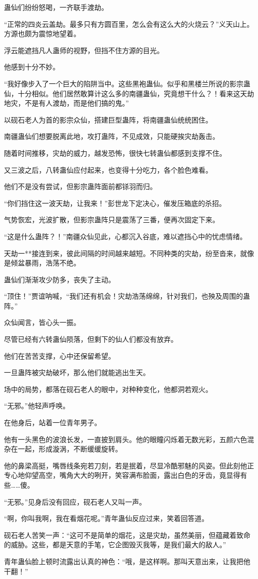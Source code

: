 \begin{this_body}
蛊仙们纷纷怒喝，一齐联手渡劫。

“正常的四炎云盖劫。最多只有方圆百里，怎么会有这么大的火烧云？”义天山上。方源也颇为震惊地望着。

浮云能遮挡凡人蛊师的视野，但挡不住方源的目光。

他感到十分不妙。

“我好像步入了一个巨大的陷阱当中。这些黑袍蛊仙。似乎和黑楼兰所说的影宗蛊仙，十分相似。他们居然敢算计这么多的南疆蛊仙，究竟想干什么？！看来这天劫地灾，不是有人渡劫，而是他们搞的鬼。”

以砚石老人为首的影宗众仙，搭建巨型蛊阵，将南疆蛊仙统统困住。

南疆蛊仙们想要脱离此地，攻打蛊阵，不见成效，只能硬挨灾劫轰击。

随着时间推移，灾劫的威力，越发恐怖，很快七转蛊仙都感到支撑不住。

又三波之后，八转蛊仙应付起来，也变得十分吃力，各个脸色难看。

他们不是没有尝试，但影宗蛊阵面前都铩羽而归。

“你们挡住这一波天劫，让我来！”彭世龙下定决心，催发压箱底的杀招。

气势恢宏，光波扩散，但影宗蛊阵只是震荡了三番，便再次固定下来。

“这是什么蛊阵？！”南疆众仙见此，心都沉入谷底，难以遮挡心中的忧虑情绪。

天劫一**接连到来，彼此间隔的时间越来越短。不同种类的灾劫，纷至沓来，就像是倾盆暴雨，浩荡不绝。

蛊仙们渐渐攻少防多，丧失了主动。

“顶住！”贾谊呐喊，“我们还有机会！灾劫浩荡绵绵，针对我们，也殃及周围的蛊阵。”

众仙闻言，皆心头一振。

尽管已经有六转蛊仙陨落，但剩下的仙人们都没有放弃。

他们在苦苦支撑，心中还保留希望。

一旦蛊阵被灾劫破坏，那么他们就能逃出生天。

场中的局势，都落在砚石老人的眼中，对种种变化，他都洞若观火。

“无邪。”他轻声呼唤。

在他身后，站着一位青年男子。

他有一头黑色的波浪长发，一直披到肩头。他的眼瞳闪烁着无数光彩，五颜六色混杂在一起，形成漩涡，不断缓缓旋转。

他的鼻梁高挺，嘴唇线条宛若刀刻，若是抿着，尽显冷酷邪魅的风姿。但此刻他正专心地仰望高空，嘴角大大的咧开，笑容满布脸面，露出白色的牙齿，竟显得有些……傻。

“无邪。”见身后没有回应，砚石老人又叫一声。

“啊，你叫我啊，我在看烟花呢。”青年蛊仙反应过来，笑着回答道。

砚石老人苦笑一声：“这可不是简单的烟花，这是灾劫，虽然美丽，但蕴藏着致命的威胁。这些，都是天意的手笔，它企图毁灭我等，是我们最大的敌人。”

青年蛊仙脸上顿时流露出认真的神色：“哦，是这样啊。那叫天意出来，让我把他干翻！”

\end{this_body}

